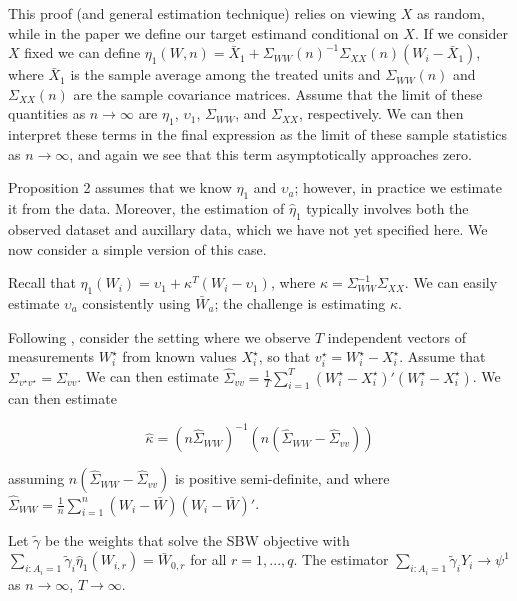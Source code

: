 \begin{remark}
This proof (and general estimation technique) relies on viewing $X$ as random, while in the paper we define our target estimand conditional on $X$. If we consider $X$ fixed we can define $\eta_1(W, n) = \bar{X}_1 + \Sigma_{WW}(n)^{-1}\Sigma_{XX}(n)(W_i - \bar{X}_1)$, where $\bar{X}_1$ is the sample average among the treated units and $\Sigma_{WW}(n)$ and $\Sigma_{XX}(n)$ are the sample covariance matrices. Assume that the limit of these quantities as $n \to \infty$ are $\eta_1$, $\upsilon_1$, $\Sigma_{WW}$, and $\Sigma_{XX}$, respectively. We can then interpret these terms in the final expression as the limit of these sample statistics as $n \to \infty$, and again we see that this term asymptotically approaches zero.
\end{remark}

Proposition 2 assumes that we know $\eta_1$ and $\upsilon_a$; however, in practice we estimate it from the data. Moreover, the estimation of $\hat{\eta}_1$ typically involves both the observed dataset and auxillary data, which we have not yet specified here. We now consider a simple version of this case.

Recall that $\eta_1(W_i) = \upsilon_1 + \kappa^T(W_i - \upsilon_1)$, where $\kappa = \Sigma_{WW}^{-1}\Sigma_{XX}$. We can easily estimate $\upsilon_a$ consistently using $\bar{W}_a$; the challenge is estimating $\kappa$. 

Following \cite{gleser1992importance}, consider the setting where we observe $T$ independent vectors of measurements $W_i^\star$ from known values $X_i^\star$, so that $v_i^\star = W_i^\star - X_i^\star$. Assume that $\Sigma_{v^\star v^\star} = \Sigma_{vv}$. We can then estimate $\hat{\Sigma}_{vv} = \frac{1}{T}\sum_{i=1}^T(W_i^\star - X_i^\star)'(W_i^\star - X_i^\star)$. We can then estimate

$$
\hat{\kappa} = (n\hat{\Sigma}_{WW})^{-1}(n(\hat{\Sigma}_{WW} - \hat{\Sigma}_{vv}))
$$

assuming $n(\hat{\Sigma}_{WW} - \hat{\Sigma}_{vv})$ is positive semi-definite, and where $\hat{\Sigma}_{WW} = \frac{1}{n}\sum_{i=1}^n (W_i - \bar{W})(W_i - \bar{W})'$. 

\begin{proposition}
Let $\tilde{\gamma}$ be the weights that solve the SBW objective with $\sum_{i: A_i = 1}\tilde{\gamma}_i\hat{\eta}_1(W_{i, r}) = \bar{W}_{0, r}$ for all $r = 1, ..., q$. The estimator $\sum_{i: A_i = 1}\tilde{\gamma}_iY_i \to \psi^1$ as $n \to \infty$, $T \to \infty$.
\end{proposition}

